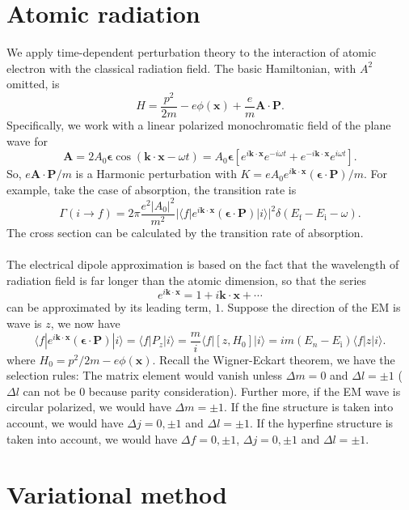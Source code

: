 \section{Atomic radiation}
We apply time-dependent perturbation theory to the interaction of atomic electron with the classical radiation field.
The basic Hamiltonian, with $A^2$ omitted, is
\[H = \frac{p^2}{2m} - e\phi(\bm{x}) + \frac{e}{m}\bm{A}\cdot\bm{P}.\]
Specifically, we work with a linear polarized monochromatic field of the plane wave for
\[\bm{A} = 2A_0\bm{\epsilon}\cos(\bm{k}\cdot\bm{x}-\omega t) = A_0\bm{\epsilon} [e^{i\bm{k}\cdot\bm{x}}e^{-i\omega t}  + e^{-i\bm{k}\cdot\bm{x}}e^{i\omega t} ].\]
So, ${e}\bm{A}\cdot\bm{P} / m$ is a Harmonic perturbation with $K = {eA_0} e^{i\bm{k}\cdot\bm{x}} (\bm{\epsilon}\cdot\bm{P})/m$.
For example, take the case of absorption, the transition rate is
\[\Gamma(i \to f) = 2\pi \frac{e^2|A_0|^2}{m^2} |\langle f |e^{i\bm{k}\cdot\bm{x}} (\bm{\epsilon}\cdot\bm{P}) |i \rangle|^2 \delta(E_{\mathrm{f}}-E_{\mathrm{i}}-\omega).\]
The cross section can be calculated by the transition rate of absorption.
\\ \\
The electrical dipole approximation is based on the fact that the wavelength of radiation field is far longer than the atomic dimension, so that the series
\[e^{i\bm{k}\cdot\bm{x}} = 1+ i\bm{k}\cdot\bm{x}+\cdots\]
can be approximated by its leading term, $1$. Suppose the direction of the EM is wave is $z$, we now have
\[\langle f |e^{i\bm{k}\cdot\bm{x}} (\bm{\epsilon}\cdot\bm{P}) |i \rangle = \langle f | P_z |i \rangle = \frac{m}{i} \langle f |  [z,H_0] |i \rangle = im(E_n-E_{\mathrm{i}})\langle f | z |i \rangle  .\]
where $H_0 = {p^2}/{2m} - e\phi(\bm{x})$.
Recall the Wigner-Eckart theorem, we have the selection rules: The matrix element would vanish unless $\Delta m = 0$ and $\Delta l = \pm 1$ ($\Delta l $ can not be $0$ because parity consideration). Further more, if the EM wave is circular polarized, we would have $\Delta m = \pm 1$. If the fine structure is taken into account, we would have $\Delta j = 0,\pm 1$ and $\Delta l = \pm 1$. If the hyperfine structure is taken into account, we would have $\Delta f = 0,\pm 1$, $\Delta j = 0,\pm 1$ and $\Delta l = \pm 1$.

\section{Variational method}
